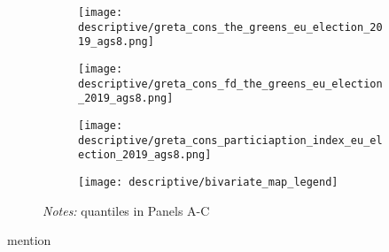 \documentclass[11pt, a4paper]{article} %
\begin{document}
\begin{figure}[H]\centering
	\caption{Spatial correlation of the vote share of the Greens and strike participation}
	\label{fig_greta_cons:xxx}
	\begin{subfigure}[h]{0.45\linewidth}\centering
		\texttt{[image: descriptive/greta\_cons\_the\_greens\_eu\_election\_2019\_ags8.png]}
	\end{subfigure}
	\begin{subfigure}[h]{0.45\linewidth}\centering
		\texttt{[image: descriptive/greta\_cons\_fd\_the\_greens\_eu\_election\_2019\_ags8.png]}
	\end{subfigure}
	\begin{subfigure}[h]{0.45\linewidth}\centering
		\texttt{[image: descriptive/greta\_cons\_particiaption\_index\_eu\_election\_2019\_ags8.png]}
	\end{subfigure}
	\begin{subfigure}[h]{0.45\linewidth}\centering
		\texttt{[image: descriptive/bivariate\_map\_legend]}
	\end{subfigure}

	\begin{minipage}{0.9\linewidth}
		\scriptsize{\emph{Notes:} quantiles in Panels A-C}
	\end{minipage}
\end{figure}


mention \cite{cantoni2020persistence}
\end{document}
